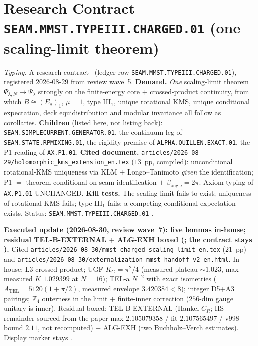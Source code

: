 \section*{Research Contract --- \texttt{SEAM.MMST.TYPEIII.CHARGED.01} (one scaling-limit theorem)}
\noindent\emph{Typing.} A research contract \mO\ (ledger row
\texttt{SEAM.MMST.TYPEIII.CHARGED.01}), registered 2026-08-29 from review wave~5.
\textbf{Demand.}  \emph{One} scaling-limit theorem $\Psi_{\lambda,N}\to\Psi_\lambda$ strongly on
the finite-energy core $+$ crossed-product continuity, from which $B\cong(E_8)_1$, $\mu=1$,
type III$_1$, unique rotational KMS, unique conditional expectation, deck equidistribution and
modular invariance all follow as corollaries.  \textbf{Children} (listed here, not listing back):
\texttt{SEAM.SIMPLECURRENT.GENERATOR.01}, the continuum leg of \texttt{SEAM.STATE.RPMIXING.01},
the rigidity premise of \texttt{ALPHA.QUILLEN.EXACT.01}, the P1 reading of \texttt{AX.P1.01}.
\textbf{Cited document.}
\texttt{articles/2026-08-29/holomorphic\_kms\_extension\_en.tex} ($13$~pp, compiled):
unconditional rotational-KMS uniqueness via KLM $+$ Longo--Tanimoto \emph{given} the
identification; P1 $=$ theorem-conditional on seam identification $+$ $\beta_{\mathrm{angle}}=2\pi$.
Axiom typing of \texttt{AX.P1.01} UNCHANGED.  \textbf{Kill tests.}  The scaling limit fails to
exist; uniqueness of rotational KMS fails; type III$_1$ fails; a competing conditional
expectation exists.  Status: \texttt{SEAM.MMST.TYPEIII.CHARGED.01} \mO.

\par\smallskip\noindent\textbf{Executed update (2026-08-30, review wave~7): five lemmas
in-house; residual TEL-B-EXTERNAL $+$ ALG-EXH boxed
(; the contract stays \mO).}
Cited \texttt{articles/2026-08-30/\allowbreak mmst\_\allowbreak charged\_\allowbreak scaling\_\allowbreak limit\_\allowbreak en.tex} ($21$~pp) and
\texttt{articles/2026-08-30/\allowbreak externalization\_\allowbreak mmst\_\allowbreak handoff\_\allowbreak v2\_\allowbreak en.html}.
In-house: L3 crossed-product; UGF $K_G=\pi^2/4$ (measured plateau $\sim1.023$, max measured $K$
$1.029399$ at $N=16$); TEL-a $N^{-2}$ with exact isometries
($A_{\mathrm{TEL}}=5120(1+\pi/2)$, measured envelope $3.420384<8$);
integer D5+A3 pairings; $\mathbb Z_4$ outerness in the limit $+$ finite-inner correction
($256$-dim gauge unitary is inner).  Residual boxed: TEL-B-EXTERNAL (Hankel $C_R$; HS remainder
sourced from the paper max $2.105079358$ / fit $2.107565497$ / v998 bound $2.11$, not
recomputed) $+$ ALG-EXH (two Buchholz--Verch estimates).  Display marker stays \mO.

